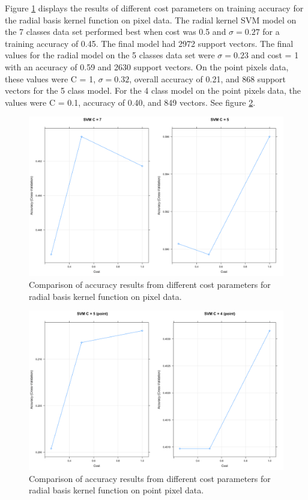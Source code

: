 \documentclass[12pt,twoside]{reedthesis}
\begin{document}
Figure \ref{fig:svm2} displays the results of different cost parameters on training accuracy for the radial basis kernel function on pixel data. The radial kernel SVM model on the 7 classes data set performed best when cost was 0.5 and \(\sigma = 0.27\) for a training accuracy of 0.45. The final model had 2972 support vectors. The final values for the radial model on the 5 classes data set were \(\sigma = 0.23\) and cost = 1 with an accuracy of 0.59 and 2630 support vectors. On the point pixels data, these values were C = 1, \(\sigma = 0.32\), overall accuracy of 0.21, and 868 support vectors for the 5 class model. For the 4 class model on the point pixels data, the values were C = 0.1, accuracy of 0.40, and 849 vectors. See figure \ref{fig:svm2c}.
\begin{figure}

{\centering \includegraphics[width=0.9\linewidth]{figure/svm2} 

}

\caption{Comparison of accuracy results from different cost parameters for radial basis kernel function on pixel data.}\label{fig:svm2}
\end{figure}
\begin{figure}

{\centering \includegraphics[width=0.9\linewidth]{figure/svm2c} 

}

\caption{Comparison of accuracy results from different cost parameters for radial basis kernel function on point pixel data.}\label{fig:svm2c}
\end{figure}
\end{document}

